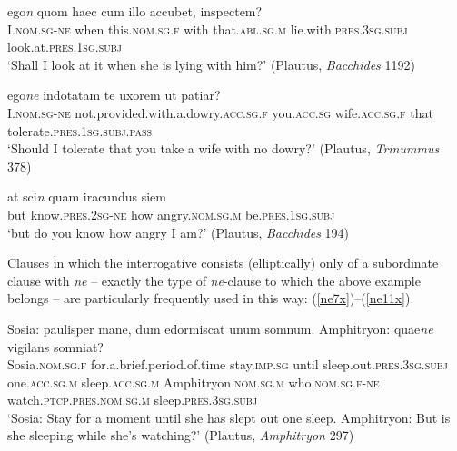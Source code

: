 \begin{exe}
\ex
\gll ego\emph{n} quom haec cum illo accubet, inspectem?\\
I.\textsc{nom.sg}-\textsc{ne} when this.\textsc{nom.sg.f} with that.\textsc{abl.sg.m} lie.with.\textsc{pres.3sg.subj} look.at.\textsc{pres.1sg.subj}\\
\trans `Shall I look at it when she is lying with him?' (Plautus, \textit{Bacchides} 1192) 
\label{ne4x}
\end{exe}

\begin{exe}
\ex
\gll ego\emph{ne} indotatam te uxorem ut patiar?\\
I.\textsc{nom.sg}-\textsc{ne} not.provided.with.a.dowry.\textsc{acc.sg.f} you.\textsc{acc.sg} wife.\textsc{acc.sg.f} that tolerate.\textsc{pres.1sg.subj.pass}\\
\trans `Should I tolerate that you take a wife with no dowry?' (Plautus, \textit{Trinummus} 378) 
\label{ne5x}
\end{exe}

\begin{exe}
\ex
\gll at sci\emph{n} quam iracundus siem\\
but know.\textsc{pres.2sg}-\textsc{ne} how angry.\textsc{nom.sg.m} be.\textsc{pres.1sg.subj}\\
\trans `but do you know how angry I am?' (Plautus, \textit{Bacchides} 194) 
\label{ne6x}
\end{exe}

Clauses in which the interrogative consists (elliptically) only of a subordinate clause with \emph{ne} -- exactly the type of \emph{ne}-clause to which the above example belongs -- are particularly frequently used in this way: (\ref{ne7x})--(\ref{ne11x}).

\begin{exe}
\ex
\gll Sosia: paulisper mane, dum edormiscat unum somnum. Amphitryon: quae\emph{ne} vigilans somniat?\\
Sosia.\textsc{nom.sg.f} for.a.brief.period.of.time stay.\textsc{imp.sg} until sleep.out.\textsc{pres.3sg.subj} one.\textsc{acc.sg.m} sleep.\textsc{acc.sg.m} Amphitryon.\textsc{nom.sg.m} who.\textsc{nom.sg.f}-\textsc{ne} watch.\textsc{ptcp.pres.nom.sg.m} sleep.\textsc{pres.3sg.subj}\\
\trans `Sosia: Stay for a moment until she has slept out one sleep. Amphitryon: But is she sleeping while she's watching?' (Plautus, \textit{Amphitryon} 297) 
\label{ne7x}
\end{exe}

